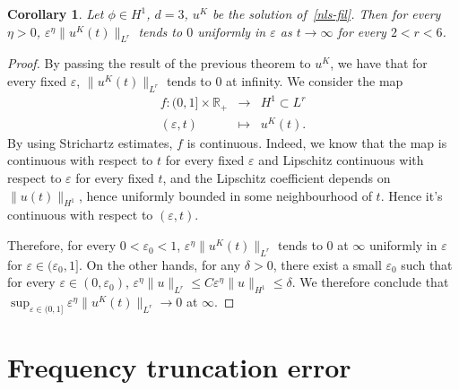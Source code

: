 \documentclass[10pt,a4paper]{article}
\newtheorem{corollary}[theorem]{Corollary}
\begin{document}
  \begin{corollary}\label{cordecayestimate}
    Let \(\phi \in H^1\), \( d = 3 \), \(u^K\) be the solution of~\eqref{nls-fil}.
    Then for every \(\eta>0\), \(\varepsilon^\eta \|u^K(t)\|_{L^r}\) tends to \(0\) uniformly in
    \(\varepsilon\) as \(t \to \infty \) for every \( 2 < r < 6\). 
  \end{corollary}

  \begin{proof}
    By passing the result of the previous theorem to \(u^K\), we have that for every fixed \(\varepsilon\),
    \(\|u^K(t)\|_{L^r}\) tends to \(0\) at infinity. We consider the map 
    \[
    \begin{array}{rcl}
      f: (0,1] \times \mathbb R_+ &\rightarrow& H^1 \subset L^r \\
    (\varepsilon,t) &\mapsto& u^K(t).
    \end{array}
    \]
    By using Strichartz estimates, \(f\) is continuous. Indeed, we know
    that the map is continuous with respect to \(t\) for every fixed \(\varepsilon\) 
    and Lipschitz continuous with respect to \(\varepsilon\) for every fixed \(t\), 
    and the Lipschitz coefficient depends on \(\|u(t)\|_{H^1}\), hence uniformly
    bounded in some neighbourhood of \(t\). Hence it's continuous with respect to \((\varepsilon,t)\).

    Therefore, for every \(0 < \varepsilon_0 < 1\), \(\varepsilon^\eta\|u^K(t)\|_{L^r}\) tends 
    to \(0\) at \(\infty\) uniformly in
    \(\varepsilon\) for \(\varepsilon \in (\varepsilon_0,1]\). On the other hands,
    for any \(\delta > 0\), there exist a small \(\varepsilon_0\) such that for
    every \(\varepsilon \in (0,\varepsilon_0)\), \(\varepsilon^\eta \|u\|_{L^r}
    \leq C \varepsilon^\eta \|u\|_{H^1} \leq \delta\). We therefore conclude
    that \(\sup_{\varepsilon \in (0,1]} \varepsilon^\eta\|u^K(t)\|_{L^r} \to 0\) at \(\infty\).
  \end{proof}
  \section{Frequency truncation error}\label{sec:freq-trunc-err}
\end{document}
